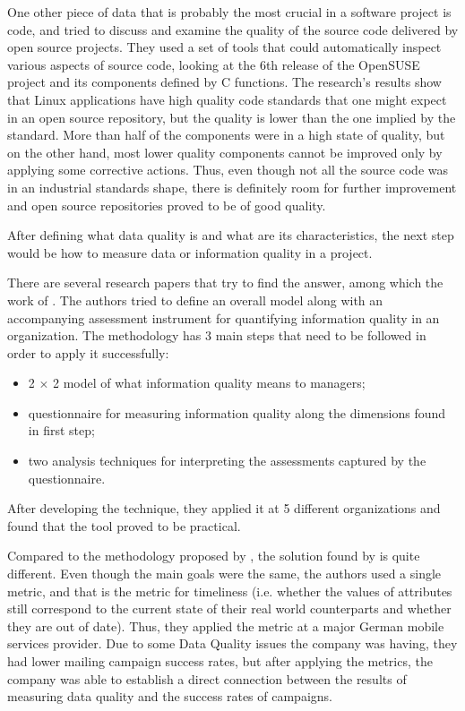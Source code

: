 \documentclass{mprop}
\begin{document}
One other piece of data that is probably the most crucial in a software project
is code, and \citet{stamelos2002code} tried to discuss and examine the quality
of the source code delivered by open source projects. They used a set of tools
that could automatically inspect various aspects of source code, looking at
the 6th release of the OpenSUSE project and its components defined by C
functions. The research's results show that Linux applications have high quality 
code standards that one might expect in an open source repository, but 
the quality is lower than the one implied by the standard. More than half
of the components were in a high state of quality, but on the other hand, 
most lower quality components cannot be improved only by applying some
corrective actions. Thus, even though not all the source code was in 
an industrial standards shape, there is definitely room for further 
improvement and open source repositories proved to be of good quality.

After defining what data quality is and what are its characteristics, the next 
step would be how to measure data or information quality in a project. 

There are several research papers that try to find the answer, among which the 
work of \citet{lee2002aimq}. The authors tried to define an overall model along 
with an accompanying assessment instrument for quantifying information quality 
in an organization. The methodology has 3 main steps that need to be followed 
in order to apply it successfully:
  \begin{itemize}
    \item 2 $\times$ 2 model of what information quality means to managers;
    \item questionnaire for measuring information quality along the dimensions
    found in first step;
    \item two analysis techniques for interpreting the assessments captured 
    by the questionnaire.
  \end{itemize} 
After developing the technique, they applied it at 5 different organizations and
found that the tool proved to be practical.

Compared to the methodology proposed by \citet{lee2002aimq}, the solution found
by \citet{Heinrich2007MetricsDataQuality} is quite different. Even though the 
main goals were the same, the authors used a single metric, and that is 
the metric for timeliness (i.e. whether the values of attributes still 
correspond to the current state of their real world counterparts and whether 
they are out of date). Thus, they applied the metric at a major German mobile 
services provider. Due to some Data Quality issues the company was having, they 
had lower mailing campaign success rates, but after applying the metrics, the 
company was able to establish a direct connection between the results of
measuring data quality and the success rates of campaigns.
\end{document}
